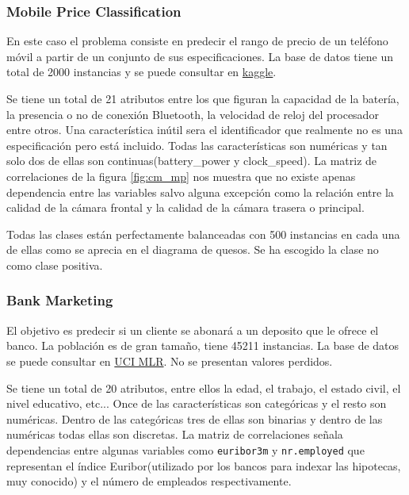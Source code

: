 \documentclass[..]{subfiles}
\begin{document}
\subsubsection{Mobile Price Classification}
En este caso el problema consiste en predecir el rango de precio de un teléfono móvil a partir de un conjunto de sus especificaciones. La base de datos tiene un total de 2000 instancias y se puede consultar en \hyperlink{https://www.kaggle.com/iabhishekofficial/mobile-price-classification}{kaggle}.

Se tiene un total de 21 atributos entre los que figuran la capacidad de la batería, la presencia o no de conexión Bluetooth, la velocidad de reloj del procesador entre otros. Una característica inútil sera el identificador que realmente no es una especificación pero está incluido. Todas las características son numéricas y tan solo dos de ellas son continuas(battery\_power y clock\_speed). La matriz de correlaciones de la figura \ref{fig:cm_mp} nos muestra que no existe apenas dependencia entre las variables salvo alguna excepción como la relación entre la calidad de la cámara frontal y la calidad de la cámara trasera o principal.

Todas las clases están perfectamente balanceadas con 500 instancias en cada una de ellas como se aprecia en el diagrama de quesos. Se ha escogido la clase no como clase positiva.

\begin{figure}[h!]
	\centering
	   \hspace{1.0cm}
	   \caption{}
\end{figure}


\subsubsection{Bank Marketing}
El objetivo es predecir si un cliente se abonará a un deposito que le ofrece el banco. La población es de gran tamaño, tiene 45211 instancias. La base de datos se puede consultar en \hyperlink{https://archive.ics.uci.edu/ml/datasets/bank+marketing}{UCI MLR}. No se presentan valores perdidos.

Se tiene un total de 20 atributos, entre ellos la edad, el trabajo, el estado civil, el nivel educativo, etc... Once de las características son categóricas y el resto son numéricas. Dentro de las categóricas tres de ellas son binarias y dentro de las numéricas todas ellas son discretas. La matriz de correlaciones señala dependencias entre algunas variables como \texttt{euribor3m} y \texttt{nr.employed} que representan el índice Euribor(utilizado por los bancos para indexar las hipotecas, muy conocido) y el número de empleados respectivamente.
\end{document}
